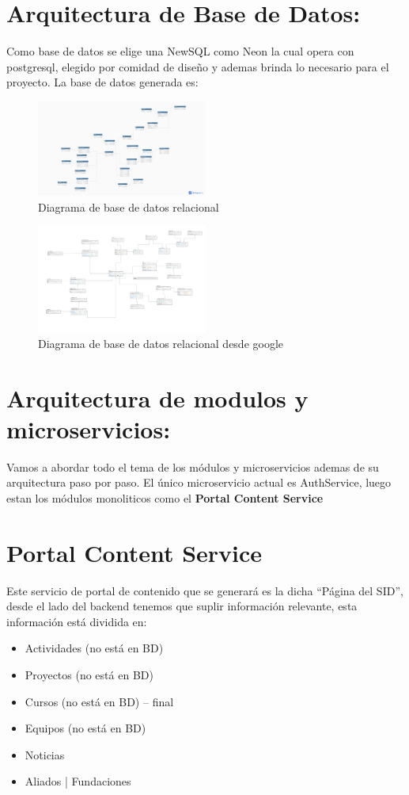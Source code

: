 \documentclass[11pt,a4paper]{article}
\begin{document}
\section{Arquitectura de Base de Datos: }
Como base de datos se elige una NewSQL como Neon la cual opera con postgresql, elegido por comidad de diseño y ademas brinda lo necesario para el proyecto.
La base de datos generada es:
\begin{figure}[H]
	\centering
	\includegraphics[width=0.5\textwidth]{src/SID_Db.pdf}
	\caption{Diagrama de base de datos relacional}
\end{figure}
\begin{figure}[H]
	\centering
	\includegraphics[width=0.5\textwidth]{src/Modelo-pica.png}
	\caption{Diagrama de base de datos relacional desde google}
\end{figure}
\section{Arquitectura de modulos y microservicios: }
Vamos a abordar todo el tema de los m{\'o}dulos y microservicios ademas de su arquitectura paso por paso.
El único microservicio actual es AuthService, luego estan los m{\'o}dulos monoliticos como el \textbf{Portal Content Service}
\section{Portal Content Service}
Este servicio de portal de contenido que se generará es la dicha ``Página del SID'', desde el lado del backend tenemos que suplir información relevante,
esta información está dividida en:
\begin{itemize}
	\item Actividades (no está en BD)
	\item Proyectos (no está en BD)
	\item Cursos (no está en BD) -- final
	\item Equipos (no está en BD)
	\item Noticias
	\item Aliados | Fundaciones
\end{itemize}
\end{document}
